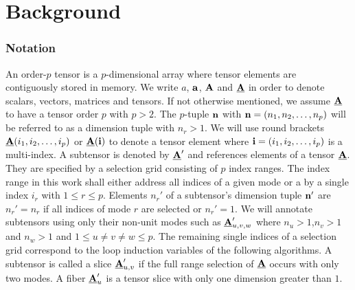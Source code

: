 \section{Background}
\label{sec:preliminaries}

\subsubsection{Notation}
\label{sec:preliminaries:notation}
An order-$p$ tensor is a $p$-dimensional array \cite{lim:2017:hypermatrices} where tensor elements are contiguously stored in memory. %
We write $a$, $\mathbf{a}$, $\mathbf{A}$ and $\underline{\mathbf{A}}$ in order to denote scalars, vectors, matrices and tensors. 
If not otherwise mentioned, we assume $\underline{\mathbf{A}}$ to have a tensor order $p$  with $p>2$.
The $p$-tuple $\mathbf{n}$ with $\mathbf{n} = (n_1,n_2,\dots,n_p)$ will be referred to as a dimension tuple with $n_r>1$.
We will use round brackets $\underline{\mathbf{A}}(i_1,i_2,\dots,i_p)$ or $\underline{\mathbf{A}}(\mathbf{i})$ to denote a tensor element where $\mathbf{i} = (i_1,i_2,\dots,i_p)$ is a multi-index.
A subtensor is denoted by $\underline{\mathbf{A}}'$ and references elements of a tensor $\underline{\mathbf{A}}$.
They are specified by a selection grid consisting of $p$ index ranges.
The index range in this work shall either address all indices of a given mode or a by a single index $i_r$ with $1 \leq r \leq p$. %
Elements $n_r'$ of a subtensor's dimension tuple $\mathbf{n}'$ are $n_r' = n_r$ if all indices of mode $r$ are selected or $n_r'=1$.
We will annotate subtensors using only their non-unit modes such as $\underline{\mathbf{A}}_{u,v,w}'$ where $n_u > 1$,$n_v > 1$ and $n_w >1$ and $1 \leq u \neq v \neq w \leq p$.
The remaining single indices of a selection grid correspond to the loop induction variables of the following algorithms.
A subtensor is called a slice $\underline{\mathbf{A}}_{u,v}'$ if the full range selection of $\underline{\mathbf{A}}$ occurs with only two modes.
A fiber $\underline{\mathbf{A}}_u'$ is a tensor slice with only one dimension greater than $1$.
\vspace{-1em}

